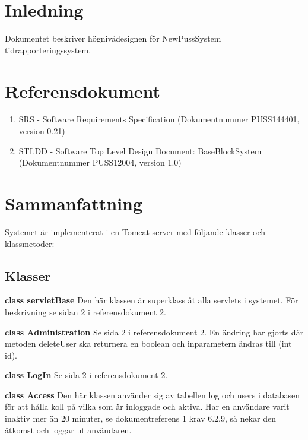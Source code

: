 \documentclass[a4paper]{article}
\begin{document}
\section{Inledning}       
Dokumentet beskriver högnivådesignen för NewPussSystem tidrapporteringssystem.


\section{Referensdokument}
\begin{enumerate}
\item SRS - Software Requirements Specification (Dokumentnummer PUSS144401, version 0.21)
\item STLDD - Software Top Level Design Document: BaseBlockSystem (Dokumentnummer PUSS12004, version 1.0)
\end{enumerate}



\section{Sammanfattning}
Systemet är implementerat i en Tomcat server med följande klasser och klassmetoder:

\subsection{Klasser}
\begin{hangparas}{1.5em}{1}
\textbf{class servletBase} Den här klassen är superklass åt alla servlets i systemet. För beskrivning se sidan 2 i referensdokument 2.
\end{hangparas} 

\vspace{5mm}
\begin{hangparas}{1.5em}{1}
\textbf{class Administration} Se sida 2 i referensdokument 2. En ändring har gjorts där metoden deleteUser ska returnera en boolean och inparametern ändras till (int id).
\end{hangparas}

\vspace{5mm}
\begin{hangparas}{1.5em}{1}
\textbf{class LogIn} Se sida 2 i referensdokument 2.
\end{hangparas}

\vspace{5mm}
\begin{hangparas}{1.5em}{1}
\textbf{class Access} Den här klassen använder sig av tabellen log och users i databasen för att hålla koll på vilka som är inloggade och aktiva. Har en användare varit inaktiv mer än 20 minuter, se dokumentreferens 1 krav 6.2.9, så nekar den åtkomst och loggar ut användaren. \end{hangparas}
\end{document}
